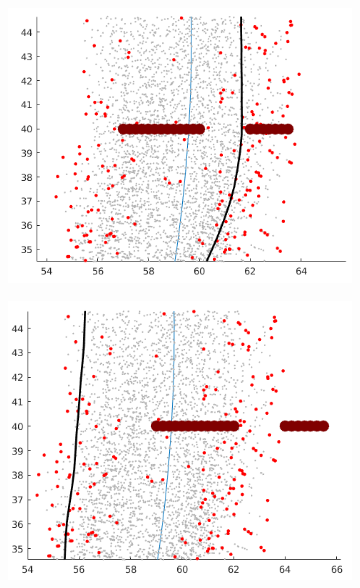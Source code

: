\begin{figure}[h]
\begin{subfigure}{.24\textwidth}
	\includegraphics[width=\textwidth]{figures/dyn_prog_dis_1_high.png}
	\end{subfigure}
	\begin{subfigure}{.24\textwidth}
	\includegraphics[width=\textwidth]{figures/dyn_prog_dis_2_high.png}
	\end{subfigure}
	\begin{subfigure}{.24\textwidth}

\end{subfigure}
\end{figure}
